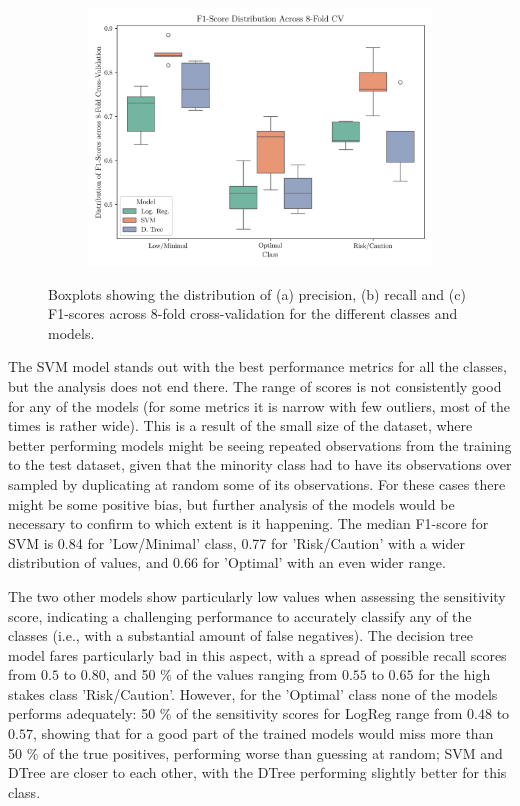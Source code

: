 \documentclass[conference]{IEEEtran}
\begin{document}
\begin{figure}[H]
    \begin{subfigure}[1]{\linewidth}
        \centering
        \includegraphics[width=0.91\linewidth]{assets/box_f1score.png}
        \caption{ }
        \label{box_f1score}
    \end{subfigure}
    
    \caption{Boxplots showing the distribution of (a) precision, (b) recall and (c) F1-scores across 8-fold cross-validation for the different classes and models.}
    \label{box_plots1}
\end{figure} %

The SVM model stands out with the best performance metrics for all the classes, but the analysis does not end there. The range of scores is not consistently good for any of the models (for some metrics it is narrow with few outliers, most of the times is rather wide). This is a result of the small size of the dataset, where better performing models might be seeing repeated observations from the training to the test dataset, given that the minority class had to have its observations over sampled by duplicating at random some of its observations. For these cases there might be some positive bias, but further analysis of the models would be necessary to confirm to which extent is it happening. The median F1-score for SVM is 0.84 for 'Low/Minimal' class, 0.77 for 'Risk/Caution' with a wider distribution of values, and 0.66 for 'Optimal' with an even wider range. 

The two other models show particularly low values when assessing the sensitivity score, indicating a challenging performance to accurately classify any of the classes (i.e., with a substantial amount of false negatives). The decision tree model fares particularly bad in this aspect, with a spread of possible recall scores from $0.5$ to $0.80$, and 50 \% of the values ranging from $0.55$ to $0.65$ for the high stakes class 'Risk/Caution'. However, for the 'Optimal' class none of the models performs adequately: 50 \% of the sensitivity scores for LogReg range from $0.48$ to $0.57$, showing that for a good part of the trained models would miss more than 50 \% of the true positives, performing worse than guessing at random; SVM and DTree are closer to each other, with the DTree performing slightly better for this class.
\end{document}
